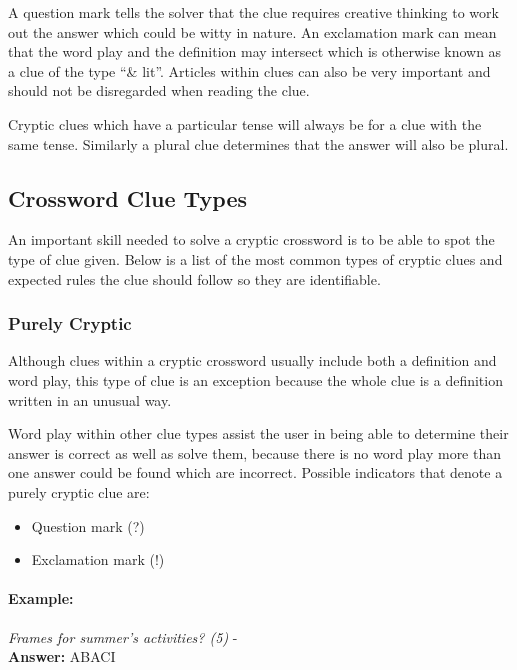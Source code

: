 A question mark tells the solver that the clue requires creative thinking to
work out the answer which could be witty in nature. An exclamation mark can mean
that the word play and the definition may intersect which is otherwise known as
a clue of the type ``\& lit''. Articles within clues can also be very important
and should not be disregarded when reading the clue.

Cryptic clues which have a particular tense will always be for a clue with the
same tense. Similarly a plural clue determines that the answer will also be
plural.


\subsection{Crossword Clue Types}

An important skill needed to solve a cryptic crossword is to be able to spot the
type of clue given. Below is a list of the most common types of cryptic clues and expected rules the clue should follow so they are identifiable. 


\subsubsection{Purely Cryptic}

Although clues within a cryptic crossword usually include both a definition and
word play, this type of clue is an exception because the whole clue is a
definition written in an unusual way.

Word play within other clue types assist the user in being able to determine
their answer is correct as well as solve them, because there is no word play
more than one answer could be found which are incorrect. Possible indicators
that denote a purely cryptic clue are:

\begin{itemize} 
  \item Question mark (?)
  \item Exclamation mark (!)
\end{itemize} 

\paragraph{Example:} \emph{Frames for summer's activities? (5)} - \citep{shuchiCryptic08} \\
\textbf{Answer:} ABACI 

